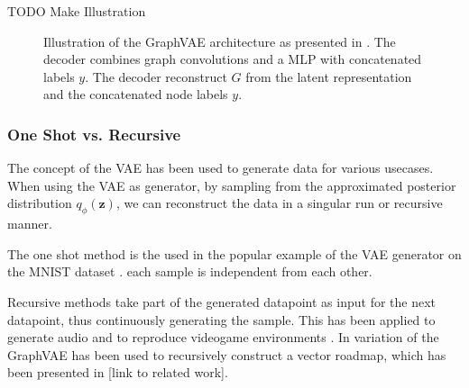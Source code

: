 TODO Make Illustration

\begin{figure}[h]
    \centering
    \caption{Illustration of the GraphVAE architecture as presented in \cite{simonovsky_graphvae_2018}. The decoder combines graph convolutions and a MLP with concatenated labels $y$. The decoder reconstruct ${G}$ from the latent representation and the concatenated node labels $y$.}
    \label{fig:simonGVAE}
\end{figure}







\subsubsection{One Shot vs. Recursive}
The concept of the VAE has been used to generate data for various usecases. When using the VAE as generator, by sampling from the approximated posterior distribution $q_{\phi}\left(\mathbf{z}\right)$, we can reconstruct the data in a singular run or recursive manner.

The one shot method is the used in the popular example of the VAE generator on the MNIST dataset \cite{kingma_auto-encoding_2014}. each sample is independent from each other.

Recursive methods take part of the generated datapoint as input for the next datapoint, thus continuously generating the sample. This has been applied to generate audio and to reproduce videogame environments \cite{ha_world_2018}. In \cite{belli_image-conditioned_2019} variation of the GraphVAE has been used to recursively construct a vector roadmap, which has been presented in [link to related work].

